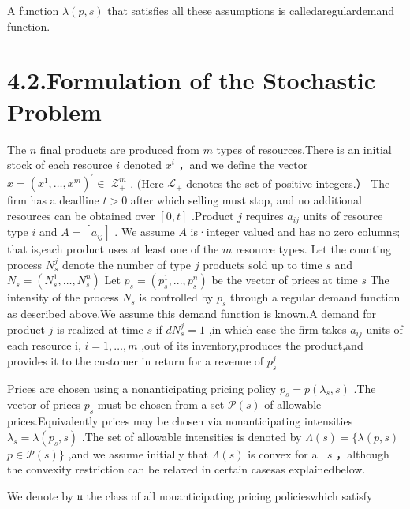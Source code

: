 A function \(\lambda ( p , s )\) that satisfies all these assumptions is
calledaregulardemand function.

\section{4.2.Formulation of the Stochastic
Problem}\label{formulation-of-the-stochastic-problem}

The \(n\) final products are produced from \(m\) types of
resources.There is an initial stock of each resource \(i\) denoted
\(x ^ { i }\) ，and we define the vector
\(x = ( x ^ { 1 } , \ldots , x ^ { m } ) ^ { \prime } \in\)
\(\mathscr { Z } _ { + } ^ { m }\) . (Here \(\mathscr { L } _ { + }\)
denotes the set of positive integers.） The firm has a deadline
\(t > 0\) after which selling must stop, and no additional resources can
be obtained over \([ 0 , t ]\) .Product \(j\) requires \(a _ { i j }\)
units of resource type \(i\) and \(A = [ a _ { i j } ]\) . We assume
\(A\) is·integer valued and has no zero columns; that is,each product
uses at least one of the \(m\) resource types. Let the counting process
\(N _ { s } ^ { j }\) denote the number of type \(j\) products sold up
to time \(s\) and
\(N _ { s } = ( N _ { s } ^ { 1 } , \ldots , N _ { s } ^ { n } )\) Let
\(p _ { s } = ( p _ { s } ^ { 1 } , . . . , p _ { s } ^ { n } )\) be the
vector of prices at time \(s\) The intensity of the process
\(N _ { s }\) is controlled by \(p _ { s }\) through a regular demand
function as described above.We assume this demand function is known.A
demand for product \(j\) is realized at time \(s\) if
\(d N _ { s } ^ { j } = 1\) ,in which case the firm takes
\(a _ { i j }\) units of each resource i, \(i = 1 , \ldots , m\) ,out of
its inventory,produces the product,and provides it to the customer in
return for a revenue of \(p _ { s } ^ { j }\)

Prices are chosen using a nonanticipating pricing policy
\(p _ { s } = p ( \lambda _ { s } , s )\) .The vector of prices
\(p _ { s }\) must be chosen from a set \({ \mathcal { P } } ( s )\) of
allowable prices.Equivalently prices may be chosen via nonanticipating
intensities \(\lambda _ { s } = \lambda ( p _ { s } , s )\) .The set of
allowable intensities is denoted by
\(\Lambda ( s ) = \{ \lambda ( p , s )\)
\(p \in \mathcal { P } ( s ) \}\) ,and we assume initially that
\(\Lambda ( s )\) is convex for all \(s\) ，although the convexity
restriction can be relaxed in certain casesas explainedbelow.

We denote by \(\mathfrak { u }\) the class of all nonanticipating
pricing policieswhich satisfy

